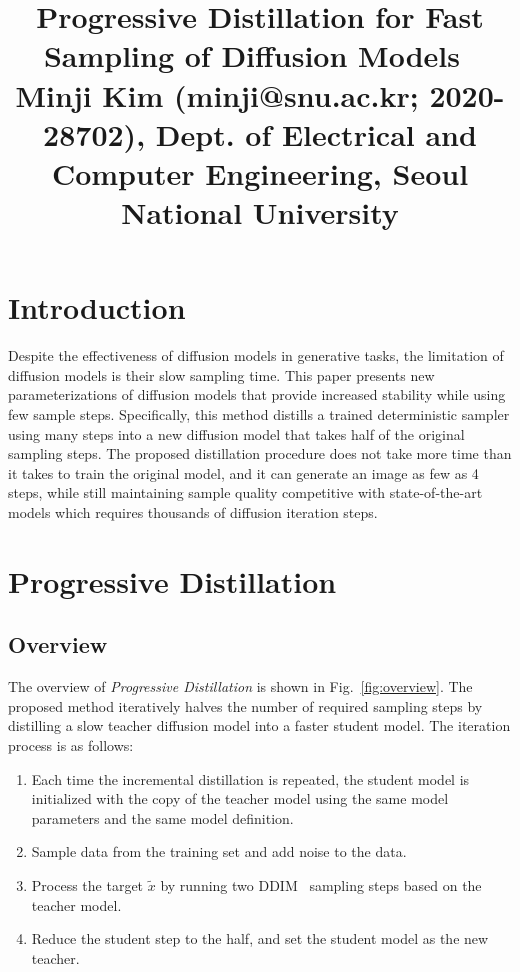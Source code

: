\documentclass[10pt,twocolumn,letterpaper]{article}
\begin{document}
\title{Progressive Distillation for Fast Sampling of Diffusion Models~\cite{progressive} \\ {\rm {\normalsize Minji Kim (minji@snu.ac.kr; 2020-28702), Dept. of Electrical and Computer Engineering, Seoul National University}}}   %

\maketitle
\thispagestyle{empty}


\section{Introduction}
Despite the effectiveness of diffusion models in generative tasks, the limitation of diffusion models is their slow sampling time.
This paper presents new parameterizations of diffusion models that provide increased stability while using few sample steps.
Specifically, this method distills a trained deterministic sampler using many steps into a new diffusion model that takes half of the original sampling steps.
The proposed distillation procedure does not take more time than it takes to train the original model, and it can generate an image as few as 4 steps, while still maintaining sample quality competitive with state-of-the-art models which requires thousands of diffusion iteration steps.



\section{Progressive Distillation}

\subsection{Overview}
The overview of \textit{Progressive Distillation} is shown in Fig.~\ref{fig:overview}.
The proposed method iteratively halves the number of required sampling steps by distilling a slow teacher diffusion model into a faster student model. The iteration process is as follows:

\begin{enumerate}
    \item Each time the incremental distillation is repeated, the student model is initialized with the copy of the teacher model using the same model parameters and the same model definition.
    \item Sample data from the training set and add noise to the data.
    \item Process the target $\tilde{x}$ by running two DDIM~\cite{ddim} sampling steps based on the teacher model.
    \item Reduce the student step to the half, and set the student model as the new teacher.
\end{enumerate}
\end{document}
